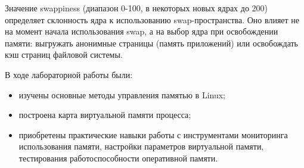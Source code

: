 Значение swappiness (диапазон 0-100, в некоторых новых ядрах до 200) определяет склонность ядра к использованию swap-пространства. Оно влияет не на момент начала использования swap, а на выбор ядра при освобождении памяти: выгружать анонимные страницы (память приложений) или освобождать кэш страниц файловой системы.


В ходе лабораторной работы были:  
\begin{itemize}
	\item изучены основные методы управления памятью в Linux;
	\item построена карта виртуальной памяти процесса;
	\item приобретены практические навыки работы с инструментами мониторинга использования памяти, настройки параметров виртуальной памяти, тестирования работоспособности оперативной памяти.
\end{itemize}


